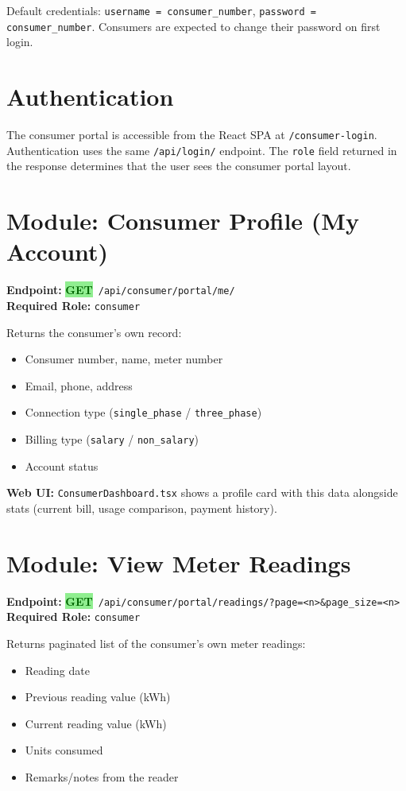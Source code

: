 \documentclass[12pt, a4paper]{report}
\newcommand{\httpget}{\colorbox{lightGreen}{\textcolor{darkGreen}{\textbf{\small GET}}}}
\newenvironment{featurelist}{%
    \begin{itemize}[leftmargin=1.5em, itemsep=2pt, parsep=0pt]
}{%
    \end{itemize}
}
\begin{document}
Default credentials: \texttt{username = consumer\_number}, \texttt{password = consumer\_number}. Consumers are expected to change their password on first login.

\section{Authentication}

The consumer portal is accessible from the React SPA at \texttt{/consumer-login}. Authentication uses the same \texttt{/api/login/} endpoint. The \texttt{role} field returned in the response determines that the user sees the consumer portal layout.

\section{Module: Consumer Profile (My Account)}

\textbf{Endpoint:} \httpget\ \texttt{/api/consumer/portal/me/}\\
\textbf{Required Role:} \texttt{consumer}

Returns the consumer's own record:
\begin{featurelist}
    \item Consumer number, name, meter number
    \item Email, phone, address
    \item Connection type (\texttt{single\_phase} / \texttt{three\_phase})
    \item Billing type (\texttt{salary} / \texttt{non\_salary})
    \item Account status
\end{featurelist}

\textbf{Web UI:} \texttt{ConsumerDashboard.tsx} shows a profile card with this data alongside stats (current bill, usage comparison, payment history).

\section{Module: View Meter Readings}

\textbf{Endpoint:} \httpget\ \texttt{/api/consumer/portal/readings/?page=<n>\&page\_size=<n>}\\
\textbf{Required Role:} \texttt{consumer}

Returns paginated list of the consumer's own meter readings:
\begin{featurelist}
    \item Reading date
    \item Previous reading value (kWh)
    \item Current reading value (kWh)
    \item Units consumed
    \item Remarks/notes from the reader
\end{featurelist}
\end{document}
